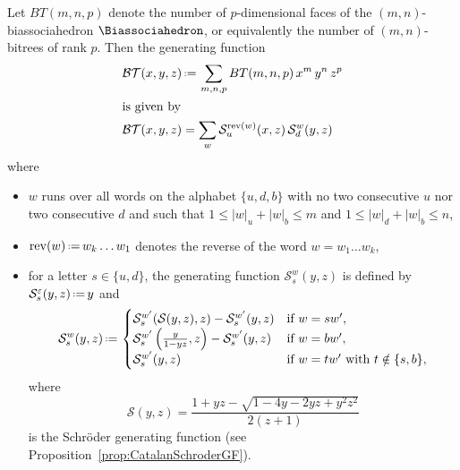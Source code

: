 \documentclass[AHL,Unicode,longabstracts,published]{cedram}
\DeclareMathOperator{\rev}{rev}
\newcommand{\eqdef}{\mbox{\,\raisebox{0.2ex}{\scriptsize\ensuremath{\mathrm:}}\ensuremath{=}\,}}
\newcommand{\BTGF}{\mathcal{BT}}
\newcommand{\SGF}{\mathcal{S}}
\begin{document}
\begin{prop}\label{prop:numberFacesBiassociahedra}
Let $BT(m,n,p)$ denote the number of $p$-dimensional faces of the $(m,n)$-biassocia\-hedron $\Biassociahedron$, or equivalently the number of $(m,n)$-bitrees of rank $p$. Then the generating function
\begin{align*}
\BTGF(x,y,z) &\eqdef \sum_{m,n,p} BT(m,n,p) \, x^m \, y^n \, z^p
\\
\intertext{is given by}
\BTGF(x,y,z) &= \sum_w \SGF^{\rev(w)}_u(x,z) \, \SGF^w_d(y,z)
\end{align*}
where
\begin{itemize}
\item $w$ runs over all words on the alphabet $\{u,d,b\}$ with no two consecutive $u$ nor two consecutive $d$ and such that $1 \le |w|_u + |w|_b \le m$ and $1 \le |w|_d + |w|_b \le n$,
\item $\rev(w) \eqdef w_k \dots w_1$ denotes the reverse of the word $w = w_1 \dots w_k$,
\item for a letter $s \in \{u,d\}$, the generating function $\SGF^w_s(y,z)$ is defined by\linebreak $\SGF^\varepsilon_s(y,z) \eqdef y$ and
\[
\SGF^{w}_s(y,z) \eqdef
\begin{cases}
\SGF^{w'}_s(\SGF(y,z), z) - \SGF^{w'}_s(y,z) & \text{if } w = sw', \\
\SGF^{w'}_s \left(\frac{y}{1-yz}, z \right) - \SGF^{w'}_s(y,z) & \text{if } w = bw', \\
\SGF^{w'}_s(y,z) & \text{if } w = tw' \text{ with } t \notin \{s,b\}, \\
\end{cases}
\]
where
\[
\SGF(y,z) = \frac{1+yz-\sqrt{1-4y-2yz+y^2z^2}}{2(z+1)}
\]
is the Schr\"oder generating function (see Proposition~\ref{prop:CatalanSchroderGF}).
\end{itemize}
\end{prop}
\end{document}
